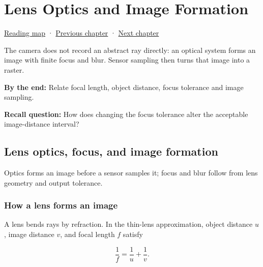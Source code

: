 \chapter{Lens Optics and Image Formation}\label{03-visual-computing-i-ch003-lens-optics-and-image-formation}\hypertarget{03-visual-computing-i-ch003}{}\label{stagechapter:03-visual-computing-i-ch003}

\hypertarget{03-visual-computing-i-ch003-lens-optics-and-image-formation}{}

\hyperref[volume-reading-map]{Reading map} · \hyperref[03-visual-computing-i-ch002-surfaces-topology-and-parameterization]{Previous chapter} · \hyperref[03-visual-computing-i-ch004-sampling-filtering-and-reconstruction]{Next chapter}

The camera does not record an abstract ray directly: an optical system forms an image with finite focus and blur. Sensor sampling then turns that image into a raster.

\textbf{By the end:} Relate focal length, object distance, focus tolerance and image sampling.

\textbf{Recall question:} How does changing the focus tolerance alter the acceptable image-distance interval?

\section{Lens optics, focus, and image formation}\label{03-visual-computing-i-ch003-lens-optics-focus-and-image-formation}

\hypertarget{03-visual-computing-i-ch003-lens-optics-focus-and-image-formation}{}

Optics forms an image before a sensor samples it; focus and blur follow from lens geometry and output tolerance.

\subsection{How a lens forms an image}\label{03-visual-computing-i-ch003-how-a-lens-forms-an-image}

\hypertarget{03-visual-computing-i-ch003-how-a-lens-forms-an-image}{}

A lens bends rays by refraction. In the thin-lens approximation, object distance \(u\), image distance \(v\), and focal length \(f\) satisfy

\[
\frac{1}{f}=\frac{1}{u}+\frac{1}{v}.
\]

